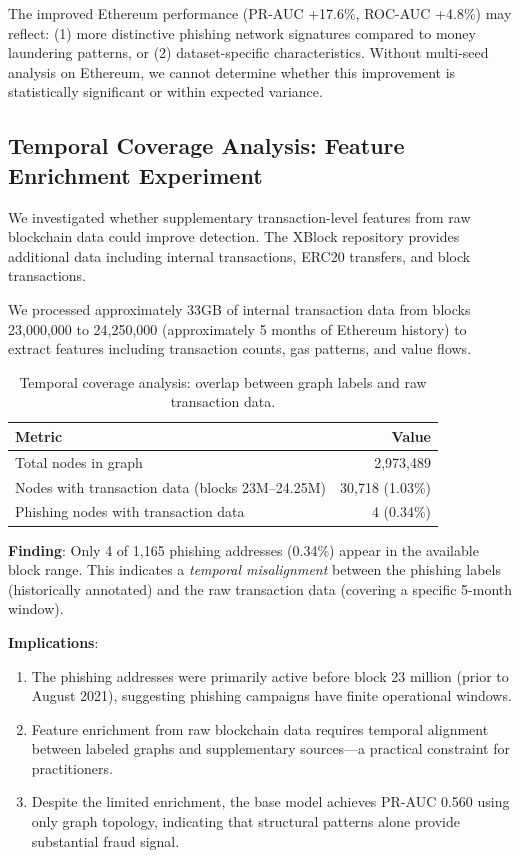 \documentclass[12pt,a4paper]{article}
\begin{document}
The improved Ethereum performance (PR-AUC +17.6\%, ROC-AUC +4.8\%) may reflect: (1) more distinctive phishing network signatures compared to money laundering patterns, or (2) dataset-specific characteristics. Without multi-seed analysis on Ethereum, we cannot determine whether this improvement is statistically significant or within expected variance.

\subsection{Temporal Coverage Analysis: Feature Enrichment Experiment}
We investigated whether supplementary transaction-level features from raw blockchain data could improve detection. The XBlock repository provides additional data including internal transactions, ERC20 transfers, and block transactions.

We processed approximately 33GB of internal transaction data from blocks 23,000,000 to 24,250,000 (approximately 5 months of Ethereum history) to extract features including transaction counts, gas patterns, and value flows.

\begin{table}[H]
\centering
\caption{Temporal coverage analysis: overlap between graph labels and raw transaction data.}
\label{tab:enrichment}
\begin{tabular}{lr}
\toprule
\textbf{Metric} & \textbf{Value} \\
\midrule
Total nodes in graph & 2,973,489 \\
Nodes with transaction data (blocks 23M--24.25M) & 30,718 (1.03\%) \\
Phishing nodes with transaction data & 4 (0.34\%) \\
\bottomrule
\end{tabular}
\end{table}

\textbf{Finding}: Only 4 of 1,165 phishing addresses (0.34\%) appear in the available block range. This indicates a \textit{temporal misalignment} between the phishing labels (historically annotated) and the raw transaction data (covering a specific 5-month window).

\textbf{Implications}:
\begin{enumerate}
    \item The phishing addresses were primarily active before block 23 million (prior to August 2021), suggesting phishing campaigns have finite operational windows.
    \item Feature enrichment from raw blockchain data requires temporal alignment between labeled graphs and supplementary sources---a practical constraint for practitioners.
    \item Despite the limited enrichment, the base model achieves PR-AUC 0.560 using only graph topology, indicating that structural patterns alone provide substantial fraud signal.
\end{enumerate}
\end{document}
